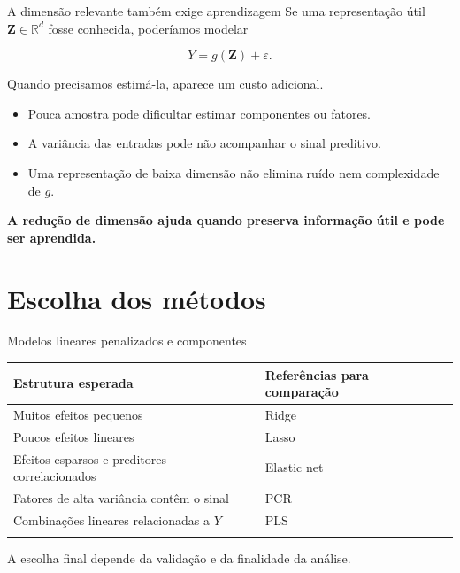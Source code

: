 \documentclass[
  10pt,
  ignorenonframetext,
  aspectratio=169,
  brazilian,
]{beamer}
\newcounter{none} %
\providecommand{\tightlist}{%
  \setlength{\itemsep}{0pt}\setlength{\parskip}{0pt}}
\begin{document}
\begin{frame}{A dimensão relevante também exige aprendizagem}
\protect{}\label{a-dimensuxe3o-relevante-tambuxe9m-exige-aprendizagem}
Se uma representação útil \(\mathbf Z\in\mathbb R^d\) fosse conhecida,
poderíamos modelar

\[
Y=g(\mathbf Z)+\varepsilon.
\]

Quando precisamos estimá-la, aparece um custo adicional.

\begin{itemize}
\tightlist
\item
  Pouca amostra pode dificultar estimar componentes ou fatores.
\item
  A variância das entradas pode não acompanhar o sinal preditivo.
\item
  Uma representação de baixa dimensão não elimina ruído nem complexidade
  de \(g\).
\end{itemize}

\textbf{A redução de dimensão ajuda quando preserva informação útil e
pode ser aprendida.}
\end{frame}

\section{Escolha dos métodos}\label{escolha-dos-muxe9todos}

\begin{frame}{Modelos lineares penalizados e componentes}
\protect{}\label{modelos-lineares-penalizados-e-componentes}
{\def\LTcaptype{none} %
\begin{longtable}[]{@{}ll@{}}
\toprule\noalign{}
Estrutura esperada & Referências para comparação \\
\midrule\noalign{}
\endhead
Muitos efeitos pequenos & Ridge \\
Poucos efeitos lineares & Lasso \\
Efeitos esparsos e preditores correlacionados & Elastic net \\
Fatores de alta variância contêm o sinal & PCR \\
Combinações lineares relacionadas a \(Y\) & PLS \\
\bottomrule\noalign{}
\end{longtable}
}

A escolha final depende da validação e da finalidade da análise.

\end{frame}
\end{document}

